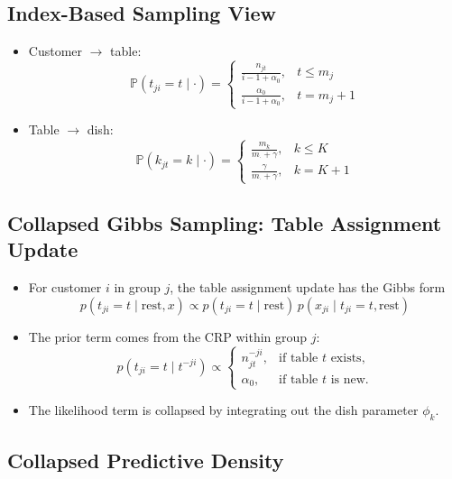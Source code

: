 \documentclass[12pt,oneside]{book}
\numberwithin{equation}{section}
\theoremstyle{definition}
\theoremstyle{plain}
\theoremstyle{remark}
\begin{document}
\subsection*{Index-Based Sampling View}

\begin{itemize}
\item Customer $\rightarrow$ table:
\[
\mathbb{P}(t_{ji} = t \mid \cdot) =
\begin{cases}
\frac{n_{jt}}{i-1+\alpha_0}, & t \le m_j \\
\frac{\alpha_0}{i-1+\alpha_0}, & t = m_j+1
\end{cases}
\]

\item Table $\rightarrow$ dish:
\[
\mathbb{P}(k_{jt} = k \mid \cdot) =
\begin{cases}
\frac{m_k}{m_{\cdot}+\gamma}, & k \le K \\
\frac{\gamma}{m_{\cdot}+\gamma}, & k = K+1
\end{cases}
\]
\end{itemize}

\subsection*{Collapsed Gibbs Sampling: Table Assignment Update}

\begin{itemize}
\item For customer $i$ in group $j$, the table assignment update has the Gibbs form
\[
p(t_{ji}=t \mid \text{rest}, x)
\propto
p(t_{ji}=t \mid \text{rest}) \,
p(x_{ji} \mid t_{ji}=t,\text{rest})
\]

\item The prior term comes from the CRP within group $j$:
\[
p(t_{ji}=t \mid t^{-ji})
\propto
\begin{cases}
n_{jt}^{-ji}, & \text{if table } t \text{ exists}, \\
\alpha_0, & \text{if table } t \text{ is new}.
\end{cases}
\]

\item The likelihood term is collapsed by integrating out the dish parameter $\phi_k$.
\end{itemize}

\subsection*{Collapsed Predictive Density}
\end{document}
